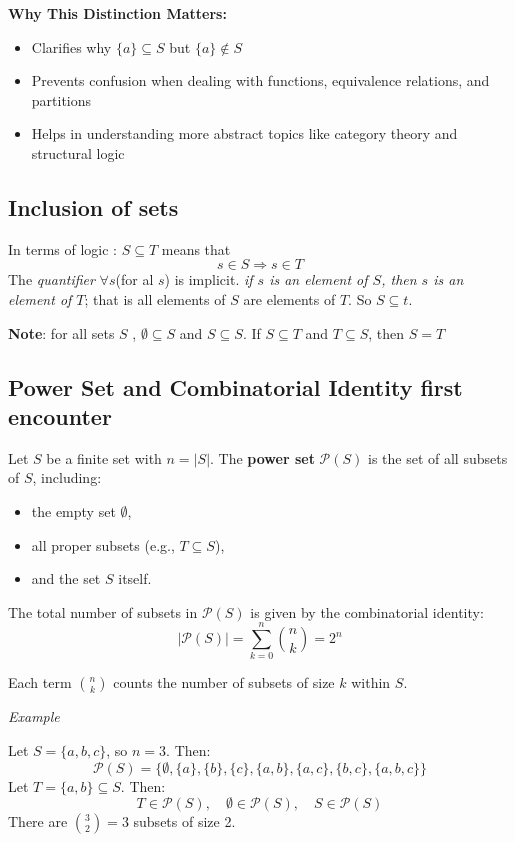 \documentclass[10pt]{article}
\theoremstyle{plain}
\theoremstyle{definition}
\begin{document}
	\vspace{1em}
	\textbf{Why This Distinction Matters:}
	\begin{itemize}
		\item Clarifies why \( \{a\} \subseteq S \) but \( \{a\} \notin S \)
		\item Prevents confusion when dealing with functions, equivalence relations, and partitions
		\item Helps in understanding more abstract topics like category theory and structural logic
	\end{itemize}
	
	
	\subsection*{Inclusion of sets}
	In terms of logic : $S \subseteq T$ means that 
	$$s \in S \Longrightarrow s \in T$$
	The \textit{quantifier} $\forall s$(for al $s$) is implicit. \textit{if $s$ is an element of $S$, then $s$ is an element of $T$}; that is all elements of $S$ are elements of $T$. So $S \subseteq t$.
	
    \textbf{Note}: for all sets $S$ , $\emptyset \subseteq S$ and $S \subseteq S$. If $S \subseteq T$ and $T \subseteq S$, then $S=T$ 
    
    \subsection*{Power Set and Combinatorial Identity first encounter}
    
    Let \( S \) be a finite set with \( n = |S| \). The \textbf{power set} \( \mathcal{P}(S) \) is the set of all subsets of \( S \), including:
    \begin{itemize}
    	\item the empty set \( \emptyset \),
    	\item all proper subsets (e.g., \( T \subseteq S \)),
    	\item and the set \( S \) itself.
    \end{itemize}
    
    The total number of subsets in \( \mathcal{P}(S) \) is given by the combinatorial identity:
    \[
    |\mathcal{P}(S)| = \sum_{k=0}^{n} \binom{n}{k} = 2^n
    \]
    
    Each term \( \binom{n}{k} \) counts the number of subsets of size \( k \) within \( S \).
    
    \textit{Example}
    
    Let \( S = \{a, b, c\} \), so \( n = 3 \). Then:
    \[
    \mathcal{P}(S) = \{\emptyset, \{a\}, \{b\}, \{c\}, \{a,b\}, \{a,c\}, \{b,c\}, \{a,b,c\}\}
    \]
    Let \( T = \{a, b\} \subseteq S \). Then:
    \[
    T \in \mathcal{P}(S), \quad \emptyset \in \mathcal{P}(S), \quad S \in \mathcal{P}(S)
    \]
    There are \( \binom{3}{2} = 3 \) subsets of size 2.
    	
\end{document}
